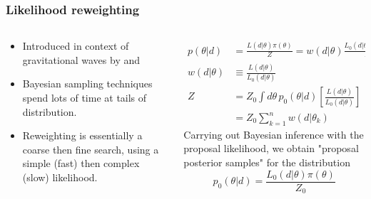 \documentclass[aspectratio=169]{beamer}
\begin{document}
    \begin{frame}
        \frametitle{Likelihood reweighting}

        \begin{columns}
            \begin{column}{0.5\textwidth}
                \begin{itemize}
                    \item Introduced in context of gravitational waves by \cite{payne2019higher} and \cite{romero2019searching}
                    \item Bayesian sampling techniques spend lots of time at tails of distribution.
                    \item Reweighting is essentially a coarse then fine search, using a simple (fast) then complex (slow) likelihood.
                \end{itemize}
            \end{column}
            \begin{column}{0.5\textwidth}
                \footnotesize
                \begin{align}
                    p(\theta|d) &= \frac{L(d|\theta)\pi(\theta)}{Z} = w(d|\theta) \frac{L_0(d|\theta)\pi(\theta)}{Z_0} \\
                    w(d|\theta) &\equiv \frac{L(d|\theta)}{L_0(d|\theta)} \\
                    Z &= Z_0 \int d\theta \, p_0(\theta|d) \left[ \frac{L(d|\theta)}{L_0(d|\theta)} \right] \\
                      &= Z_0 \sum_{k=1}^{n} w(d|\theta_k)
                \end{align}
                Carrying out Bayesian inference with the proposal likelihood, we obtain "proposal posterior samples" for the distribution
                \[
                    p_0(\theta|d) = \frac{L_0(d|\theta)\pi(\theta)}{Z_0}
                \]
            \end{column}
        \end{columns}
    \end{frame}
\end{document}
